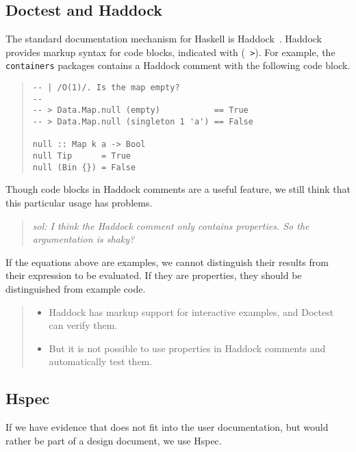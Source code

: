 \documentclass[preprint]{sigplanconf}
\begin{document}
\subsection{Doctest and Haddock}


The standard documentation mechanism for Haskell is
Haddock~\cite{haddock}.
Haddock provides markup syntax for code blocks, indicated with ({\tt
>}).
For example, the {\tt containers} packages contains a Haddock comment
with the following code block.

\begin{quote}
\small
\begin{verbatim}
-- | /O(1)/. Is the map empty?
--
-- > Data.Map.null (empty)           == True
-- > Data.Map.null (singleton 1 'a') == False

null :: Map k a -> Bool
null Tip      = True
null (Bin {}) = False
\end{verbatim}
\end{quote}

\noindent Though code blocks in Haddock comments are a useful feature,
we still think that this particular usage has problems.


\begin{quote}
    \emph{sol: I think the Haddock comment only contains properties.
    So the argumentation is shaky?}
\end{quote}

If the equations above are examples, we cannot distinguish
their results from their expression to be evaluated.
If they are properties, they should be distinguished
from example code.

\begin{quote}\begin{itemize}
    \item
        Haddock has markup support for interactive examples, and
        Doctest can verify them.
    \item
        But it is not possible to use properties in Haddock comments
        and automatically test them.
\end{itemize} \end{quote}

\subsection{Hspec}

If we have evidence that does not fit into the user documentation, but
would rather be part of a design document, we use Hspec.
\end{document}
